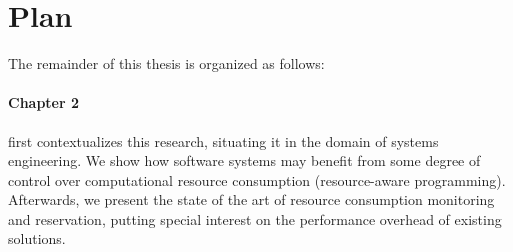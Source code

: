 %
%
%
%
%
%
%


\section{Plan}

The remainder of this thesis is organized as follows:

\paragraph{Chapter 2} first contextualizes this research, situating it in the domain of systems engineering.
We show how software systems may benefit from some degree of control over computational resource consumption (resource-aware programming).
Afterwards, we present the state of the art of resource consumption monitoring and reservation, putting special interest on the performance overhead of existing solutions.

